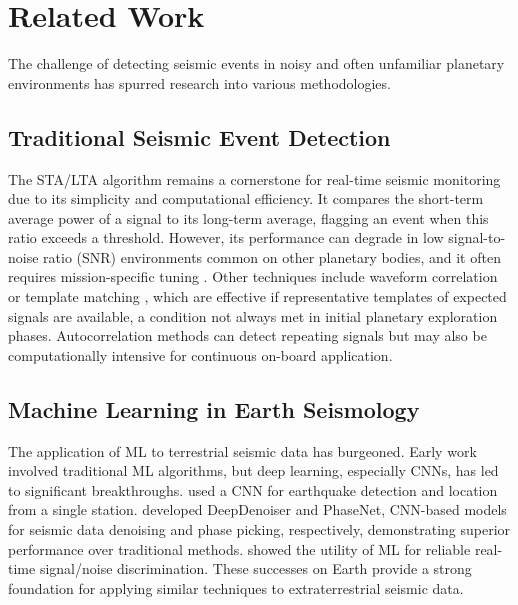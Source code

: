 \documentclass[11pt,a4paper]{article}
\begin{document}
\section{Related Work}
The challenge of detecting seismic events in noisy and often unfamiliar planetary environments has spurred research into various methodologies.

\subsection{Traditional Seismic Event Detection}
The STA/LTA algorithm \citep{allen1982automatic} remains a cornerstone for real-time seismic monitoring due to its simplicity and computational efficiency. It compares the short-term average power of a signal to its long-term average, flagging an event when this ratio exceeds a threshold. However, its performance can degrade in low signal-to-noise ratio (SNR) environments common on other planetary bodies, and it often requires mission-specific tuning \citep{lognonne2019seis}. Other techniques include waveform correlation or template matching \citep{gibbons2006detection}, which are effective if representative templates of expected signals are available, a condition not always met in initial planetary exploration phases. Autocorrelation methods \citep{brown2008autocorrelation} can detect repeating signals but may also be computationally intensive for continuous on-board application.

\subsection{Machine Learning in Earth Seismology}
The application of ML to terrestrial seismic data has burgeoned. Early work involved traditional ML algorithms, but deep learning, especially CNNs, has led to significant breakthroughs. \citet{perol2018convnetquake} used a CNN for earthquake detection and location from a single station. \citet{ross2018p, ross2018generalized} developed DeepDenoiser and PhaseNet, CNN-based models for seismic data denoising and phase picking, respectively, demonstrating superior performance over traditional methods. \citet{meier2019reliable} showed the utility of ML for reliable real-time signal/noise discrimination. These successes on Earth provide a strong foundation for applying similar techniques to extraterrestrial seismic data.
\end{document}
